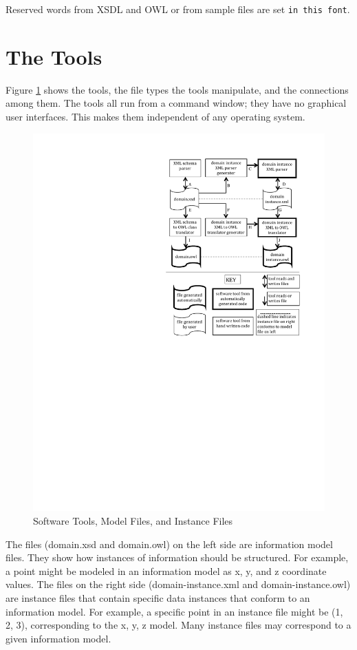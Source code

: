 \documentclass[preprint,12pt]{elsarticle}
\begin{document}
Reserved words from XSDL and OWL or from sample files are set {\tt in
  this font}.

\section{The Tools}
\label{tools}

Figure \ref{flowchart} shows the tools, the file types the tools
manipulate, and the connections among them. The tools all run from a
command window; they have no graphical user interfaces. This makes them
independent of any operating system.

\begin{figure}
	\centering
	\includegraphics [width=0.8 \textwidth]{ConversionChart.pdf}
	\caption{Software Tools, Model Files, and Instance Files}
	\label{flowchart}
\end{figure}

The files (domain.xsd and domain.owl) on the left side are information
model files. They show how instances of information should be structured.
For example, a point might be modeled in an information model as x, y, and
z coordinate values. The files on the right side (domain-instance.xml and
domain-instance.owl) are instance files that contain specific data
instances that conform to an information model. For example, a specific
point in an instance file might be (1, 2, 3), corresponding to the x, y, z
model. Many instance files may correspond to a given information model.
\end{document}
